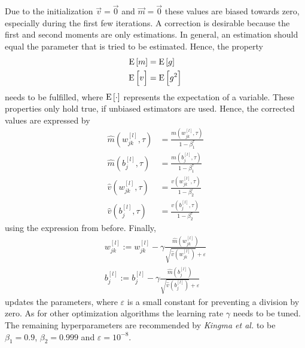 Due to the initialization $\vec{v} = \vec{0}$ and $\vec{m} = \vec{0}$ these values are biased towards zero, especially during the first few iterations.
A correction is desirable because the first and second moments are only estimations.
In general, an estimation should equal the parameter that is tried to be estimated.
Hence, the property
\begin{subequations}
	\begin{align}
		\operatorname{\mathrm{E}}\left[m\right] &= \operatorname{\mathrm{E}}\left[g\right]\\
		\operatorname{\mathrm{E}}\left[v\vphantom{g^2}\right] &= \operatorname{\mathrm{E}}\left[g^2\right]
	\end{align}
\end{subequations}
needs to be fulfilled, where $\operatorname{\mathrm{E}}\left[\cdot\right]$ represents the expectation of a variable.
These properties only hold true, if unbiased estimators are used.
Hence, the corrected values are expressed by
\begin{subequations}
	\label{eq:adam-corrected}
	\begin{align}
	\hat{m}(w^{[l]}_{jk}, \tau) &= \frac{m(w^{[l]}_{jk},\tau)}{1-\beta_1^\tau} \\
	\hat{m}(b^{[l]}_{j}, \tau) &= \frac{m(b^{[l]}_{j},\tau)}{1-\beta_1^\tau} \\
	\hat{v}(w^{[l]}_{jk}, \tau) &= \frac{v(w^{[l]}_{jk}, \tau)}{1-\beta_2^\tau} \\
	\hat{v}(b^{[l]}_{j}, \tau) &= \frac{v(b^{[l]}_{j}, \tau)}{1-\beta_2^\tau}
	\end{align}
\end{subequations}
using the expression from before.
Finally,
\begin{subequations}
	\label{eq:adam-update}
	\begin{align}
		w^{[l]}_{jk} := w^{[l]}_{jk}-\gamma \frac{\hat{m}(w^{[l]}_{jk})}{\sqrt{\hat{v}(w^{[l]}_{jk})} + \varepsilon} \\
		b^{[l]}_{j} := b^{[l]}_{j}-\gamma \frac{\hat{m}(b^{[l]}_{j})}{\sqrt{\hat{v}(b^{[l]}_{j})} + \varepsilon}
	\end{align}
\end{subequations}
updates the parameters, where $\varepsilon$ is a small constant for preventing a division by zero.
As for other optimization algorithms the learning rate $\gamma$ needs to be tuned.
The remaining hyperparameters are recommended by \textit{Kingma et al.} to be $\beta_1 = 0.9$, $\beta_2 = 0.999$ and $\varepsilon = 10^{-8}$.